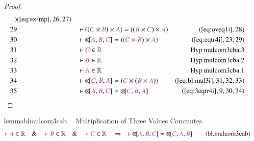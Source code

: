 \begin{proof}
\begin{align}
      )&(\mbox{\ref{eq:ax-mp}},26,27)\notag
  \\ 29 &&  & \vdash ( ( \mc{C} \times \mc{B} ) \times \mc{A} ) = ( ( \mc{B}
      \times \mc{C} ) \times \mc{A}
      )&(\mbox{\ref{eq:oveq1i}},28)\notag
  \\ 30 &&  & \vdash {\otimes\hspace{-1pt}[} \mc{A} , \mc{B} , \mc{C} ] = ( (
      \mc{C} \times \mc{B} ) \times \mc{A}
      )&(\mbox{\ref{eq:eqtr4i}},23,29)\notag
  \\ 31 &&  & \vdash \mc{C} \in
\mathbb{R}&\text{Hyp~mulcom3cba.3}\notag%
  \\ 32 &&  & \vdash \mc{B} \in
\mathbb{R}&\text{Hyp~mulcom3cba.2}\notag%
  \\ 33 &&  & \vdash \mc{A} \in
\mathbb{R}&\text{Hyp~mulcom3cba.1}\notag%
  \\ 34 &&  & \vdash {\otimes\hspace{-1pt}[} \mc{C} , \mc{B} , \mc{A} ] = (
      \mc{C} \times ( \mc{B} \times \mc{A} )
      )&(\mbox{\ref{eq:bl.mul3i}},31,32,33)\notag
  \\ 35 &&  & \vdash {\otimes\hspace{-1pt}[} \mc{A} , \mc{B} , \mc{C} ] =
      {\otimes\hspace{-1pt}[} \mc{C} , \mc{B} , \mc{A}
      ]&(\mbox{\ref{eq:3eqtr4i}},9,30,34)\notag
\end{align}
\end{proof}

\begin{restatable}{lemma}{blmulcom3cab}~~ Multiplication of Three Values
Commutes.
\begin{align}
\vdash \mc{A} \in \mathbb{R}\quad\&\quad \vdash \mc{B} \in
    \mathbb{R}\quad\&\quad \vdash \mc{C} \in \mathbb{R}\quad\Rightarrow\quad
    \vdash {\otimes\hspace{-1pt}[} \mc{A} , \mc{B} , \mc{C} ] =
    {\otimes\hspace{-1pt}[} \mc{C} , \mc{A} , \mc{B}
    ]\label{eq:bl.mulcom3cab}\tag{bl.mulcom3cab}
\end{align}
\end{restatable}

